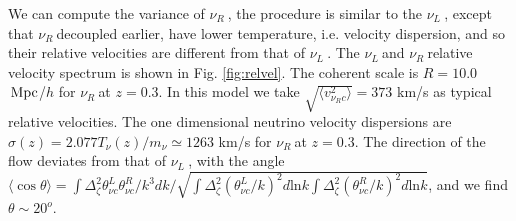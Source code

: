 \documentclass[aps,prl,twocolumn,showpacs,superscriptaddress,groupedaddress,nofootinbib]{revtex4}  %
\newcommand{\mr}{\mathrm}
\newcommand{\Mpc}{\ensuremath{\,{\rm Mpc}}}
\newcommand{\nur}{\ensuremath{{\nu_R~}}}
\newcommand{\nul}{\ensuremath{{\nu_L~}}}
\begin{document}



We can compute the variance of \nur, the procedure is similar to the \nul,
except that \nur decoupled earlier, have
lower temperature, i.e. velocity dispersion, and so their relative 
velocities are different from that of \nul.
The \nul and \nur relative velocity spectrum is shown in
Fig. \ref{fig:relvel}. The coherent scale 
is $R = 10.0$ \Mpc/$h$ for \nur at $z=0.3$. In this model we take
$\sqrt{\langle v^2_{\nu_R c}\rangle} = 373$ km/s as typical relative
velocities.  The one dimensional neutrino velocity dispersions are 
$\sigma(z)=2.077T_\nu(z)/m_\nu \simeq 1263$ km/s for \nur at $z=0.3$.   The
direction of the flow deviates from that of \nul, with the angle
$\langle\cos\theta\rangle=
\int\Delta_\zeta^2\theta^L_{\nu c}\theta^R_{\nu c}/k^3dk/ 
\sqrt{\int\Delta_\zeta^2(\theta^{L}_{\nu c}/k)^2d\mr{ln}k
\int\Delta_\zeta^2(\theta^{R}_{\nu c}/k)^2d\mr{ln}k}$, 
and we find $\theta \sim 20^o$.
\end{document}
